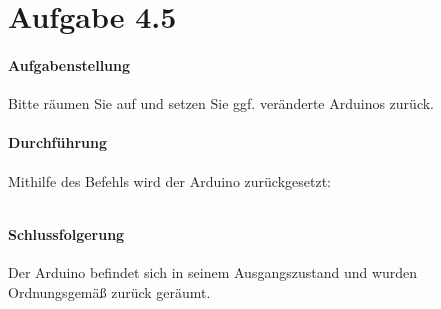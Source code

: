 



\section{Aufgabe 4.5}
\paragraph{Aufgabenstellung}
Bitte räumen Sie auf und setzen Sie ggf. veränderte Arduinos zurück.

\paragraph{Durchführung}
Mithilfe des Befehls wird der Arduino zurückgesetzt:

\inputminted[breaklines, fontsize=\fontsize{10pt}{10pt}]{bash}{../docs/reset-dmx.txt}

\paragraph{Schlussfolgerung}
Der Arduino befindet sich in seinem Ausgangszustand und wurden Ordnungsgemäß zurück geräumt.